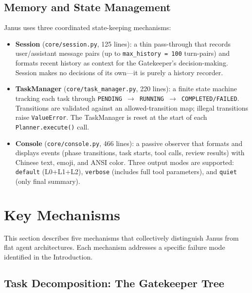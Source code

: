 \documentclass[11pt,a4paper]{article}
\begin{document}
\subsection{Memory and State Management}

Janus uses three coordinated state-keeping mechanisms:

\begin{itemize}[leftmargin=*,itemsep=2pt]
    \item \textbf{Session} (\texttt{core/session.py}, 125 lines): a thin
    pass-through that records user/assistant message pairs (up to
    \texttt{max\_history = 100} turn-pairs) and formats recent history as
    context for the Gatekeeper's decision-making. Session makes no decisions
    of its own---it is purely a history recorder.

    \item \textbf{TaskManager} (\texttt{core/task\_manager.py}, 220 lines):
    a finite state machine tracking each task through
    \texttt{PENDING $\rightarrow$ RUNNING $\rightarrow$ COMPLETED/FAILED}.
    Transitions are validated against an allowed-transition map; illegal
    transitions raise \texttt{ValueError}. The TaskManager is reset at the
    start of each \texttt{Planner.execute()} call.

    \item \textbf{Console} (\texttt{core/console.py}, 466 lines): a passive
    observer that formats and displays events (phase transitions, task starts,
    tool calls, review results) with Chinese text, emoji, and ANSI color.
    Three output modes are supported: \texttt{default} (L0+L1+L2),
    \texttt{verbose} (includes full tool parameters), and \texttt{quiet}
    (only final summary).
\end{itemize}

\section{Key Mechanisms}

This section describes five mechanisms that collectively distinguish Janus
from flat agent architectures. Each mechanism addresses a specific failure
mode identified in the Introduction.

\subsection{Task Decomposition: The Gatekeeper Tree}
\end{document}
